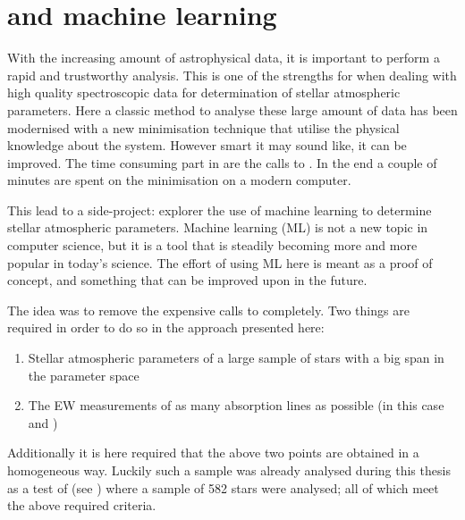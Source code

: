 \chapter{ and machine learning}
\label{cha:fasmaML}

With the increasing amount of astrophysical data, it is important to perform a rapid and trustworthy
analysis. This is one of the strengths for  when dealing with high quality spectroscopic
data for determination of stellar atmospheric parameters. Here a classic method to analyse these
large amount of data has been modernised with a new minimisation technique that utilise the physical
knowledge about the system. However smart it may sound like, it can be improved. The time consuming
part in  are the calls to . In the end a couple of minutes are spent on the
minimisation on a modern computer.

This lead to a side-project: explorer the use of machine learning to determine stellar atmospheric
parameters. Machine learning (ML) is not a new topic in computer science, but it is a tool that is
steadily becoming more and more popular in today's science. The effort of using ML here is meant as
a proof of concept, and something that can be improved upon in the future.

The idea was to remove the expensive calls to  completely. Two things are required in
order to do so in the approach presented here:
\begin{enumerate}
  \item Stellar atmospheric parameters of a large sample of stars with a big span in the parameter
        space
  \item The EW measurements of as many absorption lines as possible (in this case  and
        )
\end{enumerate}
Additionally it is here required that the above two points are obtained in a homogeneous way.
Luckily such a sample was already analysed during this thesis as a test of  (see
) where a sample of 582 stars were analysed; all of which meet the above
required criteria.

